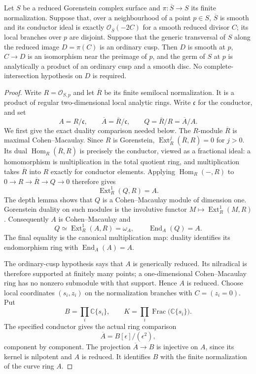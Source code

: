 
\begin{proposition}\label{cdp:st:A.5.7}
Let $S$ be a reduced Gorenstein complex surface and
$\pi:\overline S\to S$ its finite normalization.
Suppose that, over a neighbourhood of a point $p\in S$,
$\overline S$ is smooth and its conductor ideal is exactly
$\mathcal O_{\overline S}(-2C)$ for a smooth reduced
divisor $C$; its local branches over $p$ are disjoint.
Suppose that the generic transversal of $S$ along the
reduced image $D=\pi(C)$ is an ordinary cusp.
Then $D$ is smooth at $p$, $C\to D$ is an isomorphism
near the preimage of $p$, and the germ of $S$ at $p$ is
analytically a product of an ordinary cusp and a smooth disc.
No complete-intersection hypothesis on $D$ is required.
\end{proposition}
\begin{proof}
Write $R=\mathcal O_{S,p}$ and let $\overline R$ be its
finite semilocal normalization. It is a product of regular
two-dimensional local analytic rings. Write $\mathfrak c$
for the conductor, and set
\[
 A=R/\mathfrak c,\qquad
 \overline A=\overline R/\mathfrak c,\qquad
 Q=\overline R/R=\overline A/A.
\]
We first give the exact duality comparison needed below.
The $R$-module $\overline R$ is maximal Cohen--Macaulay.
Since $R$ is Gorenstein,
$\operatorname{Ext}_R^j(\overline R,R)=0$ for $j>0$.
Its dual $\operatorname{Hom}_R(\overline R,R)$ is
precisely the conductor, viewed as a fractional ideal:
a homomorphism is multiplication in the total quotient ring,
and multiplication takes $\overline R$ into $R$ exactly
for conductor elements. Applying $\operatorname{Hom}_R(-,R)$
to $0\to R\to\overline R\to Q\to0$ therefore gives
\[
 \operatorname{Ext}_R^1(Q,R)=A.                    \tag{A.J.11}\label{cdp:eq:A.J.11}
\]
The depth lemma shows that $Q$ is a Cohen--Macaulay module
of dimension one. Gorenstein duality on such modules is the
involutive functor $M\mapsto\operatorname{Ext}_R^1(M,R)$.
Consequently $A$ is Cohen--Macaulay and
\[
 Q\simeq\operatorname{Ext}_R^1(A,R)=\omega_A,
 \qquad \operatorname{End}_A(Q)=A.                \tag{A.J.12}\label{cdp:eq:A.J.12}
\]
The final equality is the canonical multiplication map:
duality identifies its endomorphism ring with
$\operatorname{End}_A(A)=A$.

The ordinary-cusp hypothesis says that $A$ is generically
reduced. Its nilradical is therefore supported at finitely
many points; a one-dimensional Cohen--Macaulay ring has
no nonzero submodule with that support. Hence $A$ is reduced.
Choose local coordinates $(s_i,z_i)$ on the normalization
branches with $C=(z_i=0)$. Put
\[
 B=\prod_i\mathbb C\{s_i\},\qquad
 K=\prod_i\operatorname{Frac}\bigl(\mathbb C\{s_i\}\bigr).
\]
The specified conductor gives the actual ring comparison
\[
 \overline A=B[\epsilon]/(\epsilon^2),             \tag{A.J.13}\label{cdp:eq:A.J.13}
\]
component by component. The projection
$\overline A\to B$ is injective on $A$, since its kernel
is nilpotent and $A$ is reduced. It identifies $B$ with
the finite normalization of the curve ring $A$.


\end{proof}
